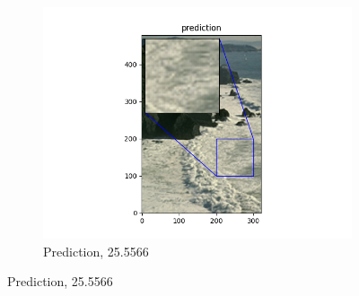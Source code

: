 \documentclass[12pt]{article}
\begin{document}
\begin{figure}[h!]
\begin{subfigure}[b]{0.32\linewidth}
    \includegraphics[width=\linewidth]{./4-prediction.png}
    \caption{Prediction, 25.5566}
  \end{subfigure}

\end{figure}
\end{document}
